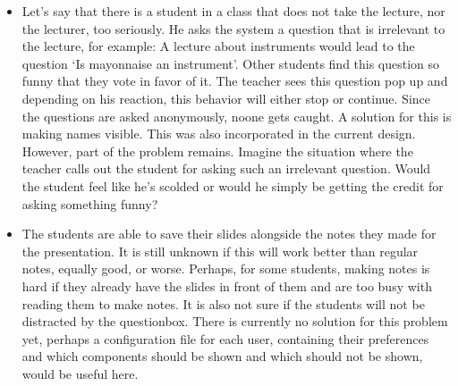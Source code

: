 \documentclass[11pt]{article}
\begin{document}
\begin{itemize}
\item Let's say that there is a student in a class that does not take the lecture, nor the lecturer, too seriously. He asks the system a question that is irrelevant to the lecture, for example: A lecture about instruments would lead to the question ‘Is mayonnaise an instrument'. Other students find this question so funny that they vote in favor of it. The teacher sees this question pop up and depending on his reaction, this behavior will either stop or continue. Since the questions are asked anonymously, noone gets caught. A solution for this is making names visible. This was also incorporated in the current design. However, part of the problem remains. Imagine the situation where the teacher calls out the student for asking such an irrelevant question. Would the student feel like he's scolded or would he simply be getting the credit for asking something funny? 

\item The students are able to save their slides alongside the notes they made for the presentation. It is still unknown if this will work better than regular notes, equally good, or worse. Perhaps, for some students, making notes is hard if they already have the slides in front of them and are too busy with reading them to make notes. It is also not sure if the students will not be distracted by the questionbox.  There is currently no solution for this problem yet, perhaps a configuration file for each user, containing their preferences and which components should be shown and which should not be shown, would be useful here. 
\end{itemize}
\end{document}
